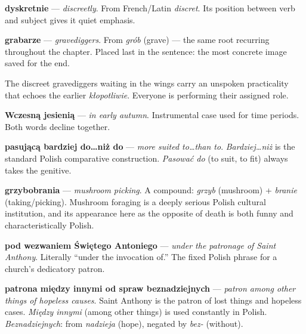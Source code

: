 \textbf{dyskretnie} — \textit{discreetly}. From French/Latin \textit{discret}. 
Its position between verb and subject gives it quiet emphasis.

\textbf{grabarze} — \textit{gravediggers}. From \textit{grób} (grave) — 
the same root recurring throughout the chapter. Placed last in the sentence: 
the most concrete image saved for the end.

The discreet gravediggers waiting in the wings carry an unspoken 
practicality that echoes the earlier \textit{kłopotliwie}. Everyone 
is performing their assigned role.



\textbf{Wczesną jesienią} — \textit{in early autumn}. Instrumental case used 
for time periods. Both words decline together.

\textbf{pasującą bardziej do\ldots niż do} — \textit{more suited to\ldots than to}. 
\textit{Bardziej\ldots niż} is the standard Polish comparative construction. 
\textit{Pasować do} (to suit, to fit) always takes the genitive.

\textbf{grzybobrania} — \textit{mushroom picking}. A compound: 
\textit{grzyb} (mushroom) + \textit{branie} (taking/picking). 
Mushroom foraging is a deeply serious Polish cultural institution, and its 
appearance here as the opposite of death is both funny and characteristically Polish.

\textbf{pod wezwaniem Świętego Antoniego} — \textit{under the patronage of 
Saint Anthony}. Literally ``under the invocation of.'' The fixed Polish phrase 
for a church's dedicatory patron.

\textbf{patrona między innymi od spraw beznadziejnych} — \textit{patron among 
other things of hopeless causes}. Saint Anthony is the patron of lost things 
and hopeless cases. \textit{Między innymi} (among other things) is used 
constantly in Polish. \textit{Beznadziejnych}: from \textit{nadzieja} (hope), 
negated by \textit{bez-} (without).

